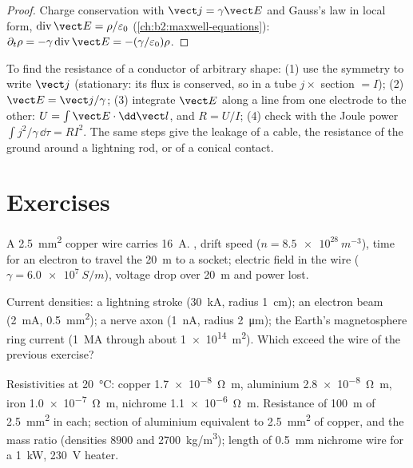 \begin{proof}
Charge conservation with $\vect j = \gamma\vect E$ and Gauss's law in local
form, $\operatorname{div}\vect E = \rho/\varepsilon_0$ (\cref{ch:b2:maxwell-equations}):
$\partial_t\rho = -\gamma\operatorname{div}\vect E = -(\gamma/\varepsilon_0)\rho$.
\end{proof}

\begin{method}\label{met:b2:charges-currents-conduction:method}
To find the resistance of a conductor of arbitrary shape: (1) use the
symmetry to write $\vect j$ (stationary: its flux is conserved, so in a
tube $j \times$ section $= I$); (2) $\vect E = \vect j/\gamma$; (3) integrate
$\vect E$ along a line from one electrode to the other: $U = \int\vect E\cdot
\dd\vect l$, and $R = U/I$; (4) check with the Joule power $\int j^2/\gamma\,
\dd\tau = RI^2$. The same steps give the leakage of a cable, the resistance
of the ground around a lightning rod, or of a conical contact.
\end{method}

\section{Exercises}

\begin{exercise}[$\star$]\label{exo:b2:charges-currents-conduction:1}
A \qty{2.5}{mm^2} copper wire carries \qty{16}{A}. , drift
speed ($n = \qty{8.5e28}{m^{-3}}$), time for an electron to travel the
\qty{20}{m} to a socket; electric field in the wire ($\gamma = \qty{6.0e7}{S/m}$),
voltage drop over \qty{20}{m} and power lost.
\end{exercise}

\begin{exercise}[$\star$]\label{exo:b2:charges-currents-conduction:2}
Current densities: a lightning stroke (\qty{30}{kA}, radius \qty{1}{cm}); an
electron beam (\qty{2}{mA}, \qty{0.5}{mm^2}); a nerve axon (\qty{1}{nA}, radius
\qty{2}{\micro m}); the Earth's magnetosphere ring current (\qty{1}{MA} through
about \qty{1e14}{m^2}). Which exceed the wire of the previous exercise?
\end{exercise}

\begin{exercise}[$\star$]\label{exo:b2:charges-currents-conduction:3}
Resistivities at \qty{20}{\degreeCelsius}: copper \qty{1.7e-8}{\ohm.m}, aluminium
\qty{2.8e-8}{\ohm.m}, iron \qty{1.0e-7}{\ohm.m}, nichrome \qty{1.1e-6}{\ohm.m}.
Resistance of \qty{100}{m} of \qty{2.5}{mm^2} in each; section of aluminium
equivalent to \qty{2.5}{mm^2} of copper, and the mass ratio (densities
$8900$ and \qty{2700}{kg/m^3}); length of \qty{0.5}{mm} nichrome wire for a
\qty{1}{kW}, \qty{230}{V} heater.
\end{exercise}

